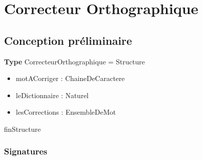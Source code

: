 
    \section*{Correcteur Orthographique}
    
    \subsection*{Conception préliminaire}
    \textbf{Type} CorrecteurOrthographique = Structure
	\begin{itemize}[label=$\ $, leftmargin=2cm]
		 \item motACorriger : ChaineDeCaractere
		 \item leDictionnaire : Naturel
		 \item lesCorrections : EnsembleDeMot
	\end{itemize}
    finStructure
    \subsubsection*{Signatures}

